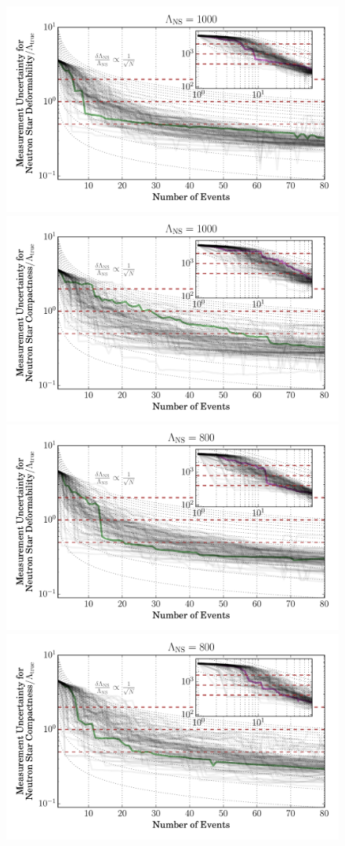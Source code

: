 \documentclass[aps,prd,amsmath,floats,floatfix, twocolumn,
superscriptaddress,nofootinbib,showpacs]{revtex4-1}
\begin{document}
\begin{figure}
\includegraphics[width=0.85\columnwidth]{plots/LambdaCIWidths_vs_N_AllPopulations_Log_L1000.pdf}
\includegraphics[width=0.85\columnwidth]{plots/LambdaCIWidths_vs_N_AstroPopulations_Log_L1000.pdf}\\
\includegraphics[width=0.85\columnwidth]{plots/LambdaCIWidths_vs_N_AllPopulations_Log_L800.pdf}
\includegraphics[width=0.85\columnwidth]{plots/LambdaCIWidths_vs_N_AstroPopulations_Log_L800.pdf}\\

\end{figure}
\end{document}
